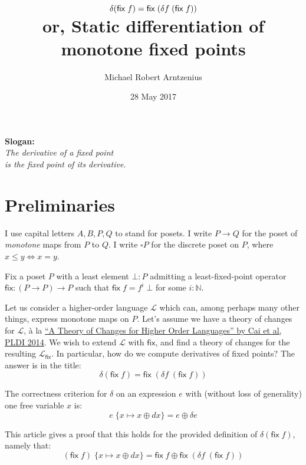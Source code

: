 \documentclass{rntz}
\title{$\dv(\fix\;f) = \fix\;(\dv{f} \; (\fix\;f))$
\\
\large or, Static differentiation of monotone fixed points}
\author{Michael Robert Arntzenius}
\date{28 May 2017}
\newcommand{\ms}[1]{\ensuremath{\mathsf{#1}}}
\newcommand{\mc}[1]{\ensuremath{\mathcal{#1}}}
\newcommand{\N}{\mathbb{N}}
\newcommand{\sub}[1]{\;\{{#1}\}}
\newcommand{\Disc}[1]{\square{#1}}
\newcommand{\fix}{\ms{fix}}
\newcommand{\dv}{\delta}
\begin{document}
\maketitle

\begin{center}
  \large
  \textbf{Slogan:}\\
  \it The derivative of a fixed point\\
  is the fixed point of its derivative.
\end{center}

\section{Preliminaries}

I use capital letters $A, B, P, Q$ to stand for posets. I write $P \to Q$ for
the poset of \emph{monotone} maps from $P$ to $Q$. I write $\Disc{P}$ for the
discrete poset on $P$, where $x \le y \iff x = y$.

Fix a poset $P$ with a least element $\bot : P$ admitting a least-fixed-point
operator $\fix : (P \to P) \to P$ such that $\fix\;f = f^i\;\bot$ for some $i :
\N$.

Let us consider a higher-order language $\mc{L}$ which can, among perhaps many
other things, express monotone maps on $P$. Let's assume we have a theory of
changes for $\mc{L}$, \`a la \href{https://arxiv.org/abs/1312.0658}{``A Theory of
  Changes for Higher Order Languages'' by Cai et al, PLDI 2014}. We wish to
extend $\mc{L}$ with $\fix$, and find a theory of changes for the resulting
$\mc{L}_\fix$. In particular, how do we compute derivatives of fixed points? The
answer is in the title:
\[ \dv(\fix\;f) = \fix\;(\dv{f} \; (\fix\;f)) \]


The correctness criterion for $\dv$ on an expression $e$ with (without loss of
generality) one free variable $x$ is:
\begin{equation}
  e \sub{x \mapsto x \oplus dx} = e \oplus \dv e
  \label{eqn:correctness}
\end{equation}

This article gives a proof that this holds for the provided definition of
$\dv(\fix\;f)$, namely that:
\[ (\fix\;f) \sub{x \mapsto x \oplus dx} = \fix\;f \oplus \fix\;(\dv f \; (\fix\;f)) \]
\end{document}
